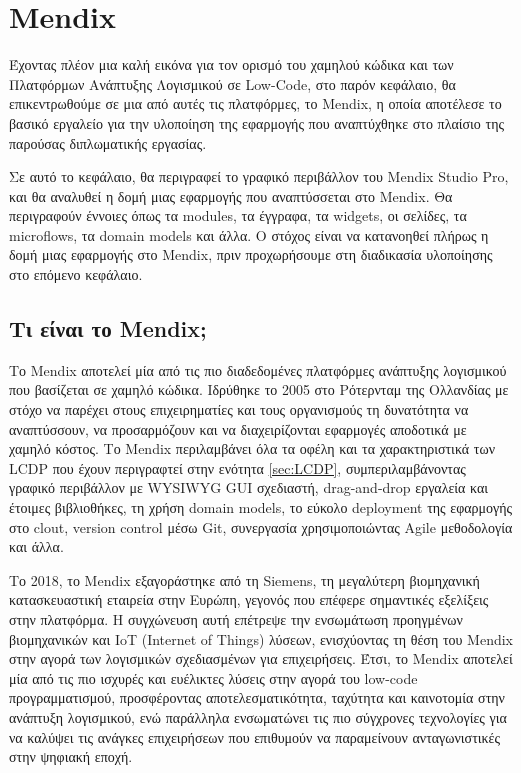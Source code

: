 \chapter{Mendix} \label{ch:mendix}
    Έχοντας πλέον μια καλή εικόνα για τον ορισμό του χαμηλού κώδικα και των Πλατφόρμων Ανάπτυξης Λογισμικού σε Low-Code, στο παρόν κεφάλαιο, θα επικεντρωθούμε σε μια από αυτές τις πλατφόρμες, το Mendix, η οποία αποτέλεσε το βασικό εργαλείο για την υλοποίηση της εφαρμογής που αναπτύχθηκε στο πλαίσιο της παρούσας διπλωματικής εργασίας.

    Σε αυτό το κεφάλαιο, θα περιγραφεί το γραφικό περιβάλλον του Mendix Studio Pro, και θα αναλυθεί η δομή μιας εφαρμογής που αναπτύσσεται στο Mendix. Θα περιγραφούν έννοιες όπως τα modules, τα έγγραφα, τα widgets, οι σελίδες, τα microflows, τα domain models και άλλα. Ο στόχος είναι να κατανοηθεί πλήρως η δομή μιας εφαρμογής στο Mendix, πριν προχωρήσουμε στη διαδικασία υλοποίησης στο επόμενο κεφάλαιο.

    \section{Τι είναι το Mendix;}
        Το Mendix αποτελεί μία από τις πιο διαδεδομένες πλατφόρμες ανάπτυξης λογισμικού που βασίζεται σε χαμηλό κώδικα. Ιδρύθηκε το 2005 στο Ρότερνταμ της Ολλανδίας με στόχο να παρέχει στους επιχειρηματίες και τους οργανισμούς τη δυνατότητα να αναπτύσσουν, να προσαρμόζουν και να διαχειρίζονται εφαρμογές αποδοτικά με χαμηλό κόστος. Το Mendix περιλαμβάνει όλα τα οφέλη και τα χαρακτηριστικά των LCDP που έχουν περιγραφτεί στην ενότητα \ref{sec:LCDP}, συμπεριλαμβάνοντας γραφικό περιβάλλον με WYSIWYG GUI σχεδιαστή, drag-and-drop εργαλεία και έτοιμες βιβλιοθήκες, τη χρήση domain models, το εύκολο deployment της εφαρμογής στο clout, version control μέσω Git, συνεργασία χρησιμοποιώντας Agile μεθοδολογία και άλλα.

        Το 2018, το Mendix εξαγοράστηκε από τη Siemens, τη μεγαλύτερη βιομηχανική κατασκευαστική εταιρεία στην Ευρώπη, γεγονός που επέφερε σημαντικές εξελίξεις στην πλατφόρμα. Η συγχώνευση αυτή επέτρεψε την ενσωμάτωση προηγμένων βιομηχανικών και IoT (Internet of Things) λύσεων, ενισχύοντας τη θέση του Mendix στην αγορά των λογισμικών σχεδιασμένων για επιχειρήσεις. Έτσι, το Mendix αποτελεί μία από τις πιο ισχυρές και ευέλικτες λύσεις στην αγορά του low-code προγραμματισμού, προσφέροντας αποτελεσματικότητα, ταχύτητα και καινοτομία στην ανάπτυξη λογισμικού, ενώ παράλληλα ενσωματώνει τις πιο σύγχρονες τεχνολογίες για να καλύψει τις ανάγκες επιχειρήσεων που επιθυμούν να παραμείνουν ανταγωνιστικές στην ψηφιακή εποχή. \cite{LowCodeMendix}

